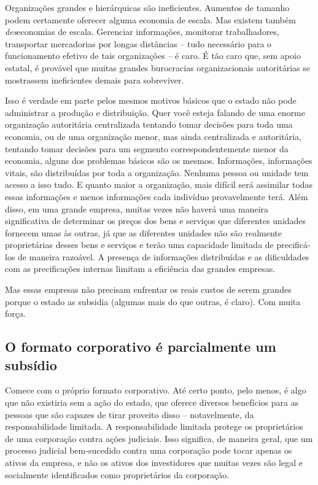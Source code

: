 Organizações grandes e hierárquicas são ineficientes. Aumentos de tamanho podem certamente oferecer alguma economia de escala. Mas existem também \emph{des}economias de escala. Gerenciar informações, monitorar trabalhadores, transportar mercadorias por longas distâncias -- tudo necessário para o funcionamento efetivo de tais organizações -- é caro. É tão caro que, sem apoio estatal, é provável que muitas grandes burocracias organizacionais autoritárias se mostrassem ineficientes demais para sobreviver.

Isso é verdade em parte pelos mesmos motivos básicos que o estado não pode administrar a produção e distribuição. Quer você esteja falando de uma enorme organização autoritária centralizada tentando tomar decisões para toda uma economia, ou de uma organização menor, mas ainda centralizada e autoritária, tentando tomar decisões para um segmento correspondentemente menor da economia, alguns dos problemas básicos são os mesmos. Informações, informações vitais, são distribuídas por toda a organização. Nenhuma pessoa ou unidade tem acesso a isso tudo. E quanto maior a organização, mais difícil será assimilar todas essas informações e menos informações cada indivíduo provavelmente terá. Além disso, em uma grande empresa, muitas vezes não haverá uma maneira significativa de determinar os preços dos bens e serviços que diferentes unidades fornecem umas às outras, já que as diferentes unidades não são realmente proprietárias desses bens e serviços e terão uma capacidade limitada de precificá-los de maneira razoável. A presença de informações distribuídas e as dificuldades com as precificações internas limitam a eficiência das grandes empresas.

Mas essas empresas não precisam enfrentar os reais custos de serem grandes porque o estado as subsidia (algumas mais do que outras, é claro). Com muita força.

\subsection*{O formato corporativo é parcialmente um subsídio}

Comece com o próprio formato corporativo. Até certo ponto, pelo menos, é algo que não existiria sem a ação do estado, que oferece diversos benefícios para as pessoas que são capazes de tirar proveito disso -- notavelmente, da responsabilidade limitada. A responsabilidade limitada protege os proprietários de uma corporação contra ações judiciais. Isso significa, de maneira geral, que um processo judicial bem-sucedido contra uma corporação pode tocar apenas os ativos da empresa, e não os ativos dos investidores que muitas vezes são legal e socialmente identificados como proprietários da corporação.

